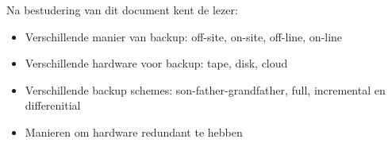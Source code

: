Na bestudering van dit document kent de lezer:
\begin{itemize}
\item Verschillende manier van backup: off-site, on-site, off-line, on-line
\item Verschillende hardware voor backup: tape, disk, cloud
\item Verschillende backup schemes: son-father-grandfather, full, incremental en differenitial
\item Manieren om hardware redundant te hebben
\end{itemize}


